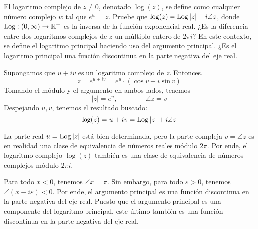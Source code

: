\begin{exercise}
El logaritmo complejo de $z \ne 0$, denotado $\log(z)$, se define como cualquier número complejo $w$ tal que $e^w = z$. Pruebe que $\log(z) = \operatorname{Log}|z| + i \angle z$, donde $\operatorname{Log} : (0, \infty) \to \mathbb R^+$ es la inversa de la función exponencial real. ¿Es la diferencia entre dos logaritmos complejos de $z$ un múltiplo entero de $2\pi i$? En este contexto, se define el logaritmo principal haciendo uso del argumento principal. ¿Es el logaritmo principal una función discontinua en la parte negativa del eje real.
\end{exercise}

\begin{solution}
Supongamos que $u + iv$ es un logaritmo complejo de $z$. Entonces,
$$z = e^{u + iv} = e^u \cdot (\cos v + i \sin v)$$
Tomando el módulo y el argumento en ambos lados, tenemos
$$|z| = e^u, \qquad \qquad \angle z = v$$
Despejando $u, v$, tenemos el resultado buscado:
$$\log(z) = u + iv = \operatorname{Log}|z| + i \angle z$$

La parte real $u = \operatorname{Log}|z|$ está bien determinada, pero la parte compleja $v = \angle z$ es en realidad una clase de equivalencia de números reales módulo $2\pi$. Por ende, el logaritmo complejo $\log(z)$ también es una clase de equivalencia de números complejos módulo $2\pi i$.

Para todo $x < 0$, tenemos $\angle x = \pi$. Sin embargo, para todo $\varepsilon > 0$, tenemos $\angle(x - i\varepsilon) < 0$. Por ende, el argumento principal es una función discontinua en la parte negativa del eje real. Puesto que el argumento principal es una componente del logaritmo principal, este último también es una función discontinua en la parte negativa del eje real.
\end{solution}

